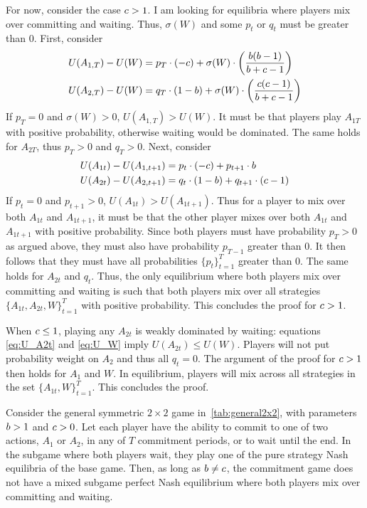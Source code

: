 \documentclass[../paper.tex]{subfiles}
\begin{document}
For now, consider the case $c > 1$.
I am looking for equilibria where players mix over committing and waiting. Thus, $\sigma(W)$ and some $p_t$ or $q_t$ must be greater than 0.
First, consider
\begin{align*}
U(A_{1, T}) - U(W) &= p_{T} \cdot (- c) + \sigma(W) \cdot \left( \frac{b(b-1)}{b+c-1} \right) \\
U(A_{2, T}) - U(W) &= q_{T} \cdot (1-b) + \sigma(W) \cdot \left( \frac{c(c-1)}{b+c-1} \right)
\end{align*}
If $p_{T}=0$ and $\sigma(W)>0$, $U(A_{1,T})>U(W)$. It must be that players play $A_{1T}$ with positive probability, otherwise waiting would be dominated. The same holds for $A_{2T}$, thus $p_T>0$ and $q_T>0$.
Next, consider
\begin{align*}
    U(A_{1t})-U(A_{1,t+1}) &= p_t \cdot (-c) + p_{t+1} \cdot b \\
    U(A_{2t})-U(A_{2,t+1}) &=  q_t \cdot (1-b) + q_{t+1} \cdot (c-1)
\end{align*}
If $p_t=0$ and $p_{t+1}>0$, $U(A_{1t})>U(A_{1t+1})$. Thus for a player to mix over both $A_{1t}$ and $A_{1t+1}$, it must be that the other player mixes over both $A_{1t}$ and $A_{1t+1}$ with positive probability. Since both players must have probability $p_T>0$ as argued above, they must also have probability $p_{T-1}$ greater than 0. It then follows that they must have all probabilities $\{p_t\}_{t=1}^T$ greater than 0. The same holds for $A_{2t}$ and $q_t$.
Thus, the only equilibrium where both players mix over committing and waiting is such that both players mix over all strategies $\{A_{1t}, A_{2t}, W\}_{t=1}^{T}$ with positive probability. This concludes the proof for $c>1$.

When $c\leq1$, playing any $A_{2t}$ is weakly dominated by waiting: equations \ref{eq:U_A2t} and \ref{eq:U_W} imply $U(A_{2t})\leq U(W)$. 
Players will not put probability weight on $A_2$ and thus all $q_t=0$. The argument of the proof for $c>1$ then holds for $A_1$ and $W$. In equilibrium, players will mix across all strategies in the set $\{A_{1t}, W\}_{t=1}^{T}$. This concludes the proof.

\begin{lemma}\label{lem:no-msne-with-pure-strats}
    Consider the general symmetric $2\times2$ game in~\autoref{tab:general2x2}, with parameters $b > 1$ and $c > 0$. 
    Let each player have the ability to commit to one of two actions, $A_1$ or $A_2$, in any of $T$ commitment periods, or to wait until the end. 
    In the subgame where both players wait, they play one of the pure strategy Nash equilibria of the base game.
    Then, as long as $b\neq c$, the commitment game does not have a mixed subgame perfect Nash equilibrium where both players mix over committing and waiting.
\end{lemma}
\end{document}
